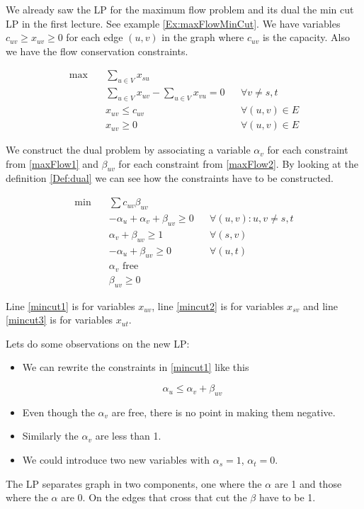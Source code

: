 \begin{Ex} We already saw the LP for the maximum flow problem and its dual the min cut LP in the first lecture. See example \ref{Ex:maxFlowMinCut}. We have variables $c_{uv} \geq x_{uv}\geq 0$ for each edge $(u,v)$ in the graph where  $c_{uv}$ is the capacity. Also we have the flow conservation constraints.

\begin{align}
\max \quad & \sum_{u\in V} x_{su}\\
&\sum_{u\in V} x_{uv} - \sum_{u\in V} x_{vu} = 0 && \forall v \neq s,t \label{maxFlow1}\\
&x_{uv} \leq c_{uv}	&& \forall (u,v)\in E\label{maxFlow2}\\
&x_{uv} \geq 0 && \forall (u,v)\in E
\end{align}

We construct the dual problem by associating a variable $\alpha_v$ for each constraint from \ref{maxFlow1} and $\beta_{uv}$ for each constraint from \ref{maxFlow2}. By looking at the definition \ref{Def:dual} we can see how the constraints have to be constructed.

\begin{align}
\min \quad & \sum c_{uv}\beta_{uv}\\
 & -\alpha_u + \alpha_v  + \beta_{uv} \geq 0 && \forall (u,v): u,v\neq s,t\label{mincut1}\\
 & \alpha_v + \beta_{uv} \geq 1 && \forall (s,v)\label{mincut2}\\
 & -\alpha_u + \beta_{uv} \geq 0 && \forall(u,t)\label{mincut3}\\
 & \alpha_v \text{ free}\\
 & \beta_{uv} \geq 0
\end{align}

Line \ref{mincut1} is for variables $x_{uv}$, line \ref{mincut2} is for variables $x_{sv}$ and line \ref{mincut3} is for variables $x_{ut}$. 

Lets do some observations on the new LP: 

\begin{itemize}
\item We can rewrite the constraints in \ref{mincut1} like this

\[\alpha_u \leq \alpha_v + \beta_{uv}\]

\item Even though the $\alpha_v$ are free, there is no point in making them negative. 
\item Similarly the $\alpha_v$ are less than 1.
\item We could introduce two new variables with $\alpha_s=1$, $\alpha_t=0$.
\end{itemize}

The LP separates graph in two components, one where the $\alpha$ are 1 and those where the $\alpha$ are 0. On the edges that cross that cut the $\beta$ have to be 1. %
\end{Ex}